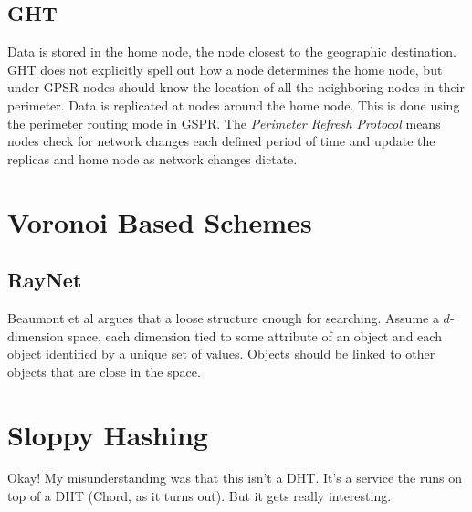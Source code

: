 \documentclass[10pt,letterpaper]{report}
\begin{document}
\subsection*{GHT}
Data is stored in the home node, the node closest to the geographic destination.
GHT does not explicitly spell out how a node determines the home node, but under GPSR nodes should know the location of all the neighboring nodes in their perimeter.  
Data is replicated at nodes around the home node.  This is done using the perimeter routing mode in GSPR.
The \textit{Perimeter Refresh Protocol} means nodes check for network changes each defined period of time and update the replicas and home node as network changes dictate.





\section{Voronoi Based Schemes}




\subsection{RayNet}

Beaumont et al argues that a loose structure enough for searching.  Assume a $d$-dimension space, each dimension tied to some attribute of an object and each object identified by a unique set of values.  Objects should be linked to other objects that are close in the space.


\section{Sloppy Hashing}

Okay!  My misunderstanding was that this isn't a DHT.  It's a service the runs on top of a DHT (Chord, as it turns out).  But it gets really interesting.
\end{document}
